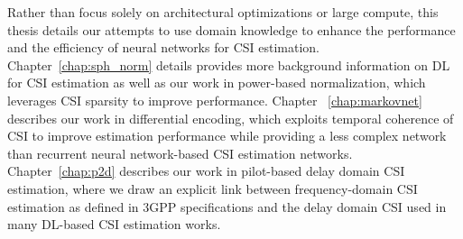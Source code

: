 Rather than focus solely on architectural optimizations or large compute, this thesis details our attempts to use domain knowledge to enhance the performance and the efficiency of neural networks for CSI estimation. Chapter~\ref{chap:sph_norm} details provides more background information on DL for CSI estimation as well as our work in power-based normalization, which leverages CSI sparsity to improve performance. Chapter ~\ref{chap:markovnet} describes our work in differential encoding, which exploits temporal coherence of CSI to improve estimation performance while providing a less complex network than recurrent neural network-based CSI estimation networks. Chapter~\ref{chap:p2d} describes our work in pilot-based delay domain CSI estimation, where we draw an explicit link between frequency-domain CSI estimation as defined in 3GPP specifications and the delay domain CSI used in many DL-based CSI estimation works.


